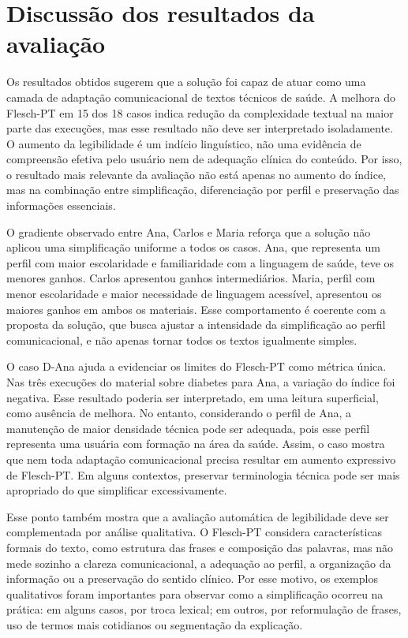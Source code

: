 \section{Discussão dos resultados da avaliação}
\label{sec:discussao-resultados-avaliacao}

Os resultados obtidos sugerem que a solução foi capaz de atuar como uma camada de adaptação comunicacional de textos técnicos de saúde. A melhora do Flesch-PT em 15 dos 18 casos indica redução da complexidade textual na maior parte das execuções, mas esse resultado não deve ser interpretado isoladamente. O aumento da legibilidade é um indício linguístico, não uma evidência de compreensão efetiva pelo usuário nem de adequação clínica do conteúdo. Por isso, o resultado mais relevante da avaliação não está apenas no aumento do índice, mas na combinação entre simplificação, diferenciação por perfil e preservação das informações essenciais.

O gradiente observado entre Ana, Carlos e Maria reforça que a solução não aplicou uma simplificação uniforme a todos os casos. Ana, que representa um perfil com maior escolaridade e familiaridade com a linguagem de saúde, teve os menores ganhos. Carlos apresentou ganhos intermediários. Maria, perfil com menor escolaridade e maior necessidade de linguagem acessível, apresentou os maiores ganhos em ambos os materiais. Esse comportamento é coerente com a proposta da solução, que busca ajustar a intensidade da simplificação ao perfil comunicacional, e não apenas tornar todos os textos igualmente simples.

O caso D-Ana ajuda a evidenciar os limites do Flesch-PT como métrica única. Nas três execuções do material sobre diabetes para Ana, a variação do índice foi negativa. Esse resultado poderia ser interpretado, em uma leitura superficial, como ausência de melhora. No entanto, considerando o perfil de Ana, a manutenção de maior densidade técnica pode ser adequada, pois esse perfil representa uma usuária com formação na área da saúde. Assim, o caso mostra que nem toda adaptação comunicacional precisa resultar em aumento expressivo de Flesch-PT. Em alguns contextos, preservar terminologia técnica pode ser mais apropriado do que simplificar excessivamente.

Esse ponto também mostra que a avaliação automática de legibilidade deve ser complementada por análise qualitativa. O Flesch-PT considera características formais do texto, como estrutura das frases e composição das palavras, mas não mede sozinho a clareza comunicacional, a adequação ao perfil, a organização da informação ou a preservação do sentido clínico. Por esse motivo, os exemplos qualitativos foram importantes para observar como a simplificação ocorreu na prática: em alguns casos, por troca lexical; em outros, por reformulação de frases, uso de termos mais cotidianos ou segmentação da explicação.

